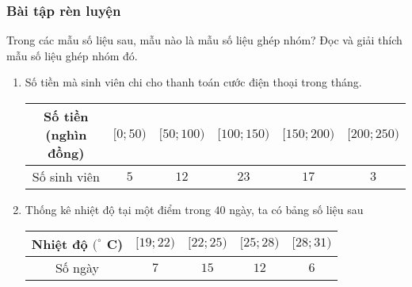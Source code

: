 \subsubsection{Bài tập rèn luyện}
\begin{bt}%
	Trong các mẫu số liệu sau, mẫu nào là mẫu số liệu ghép nhóm? Đọc và giải thích mẫu số liệu ghép nhóm đó.
	\begin{enumerate}
		\item Số tiền mà sinh viên chi cho thanh toán cước điện thoại trong tháng.
		      \begin{center}
			      \begin{tabular}{|c|c|c|c|c|c|}
				      \hline
				      Số tiền (nghìn đồng) & $[0;50)$ & $[50;100)$ & $[100;150)$ & $[150;200)$ & $[200;250)$ \\
				      \hline
				      Số sinh viên         & $5$      & $12$       & $23$        & $17$        & $3$         \\
				      \hline
			      \end{tabular}
		      \end{center}
		\item Thống kê nhiệt độ tại một điểm trong $40$ ngày, ta có bảng số liệu sau
		      \begin{center}
			      \begin{tabular}{|c|c|c|c|c|}
				      \hline
				      Nhiệt độ $(^\circ$ C) & $[19;22)$ & $[22;25)$ & $[25;28)$ & $[28;31)$ \\
				      \hline
				      Số ngày               & $7$       & $15$      & $12$      & $6$       \\
				      \hline
			      \end{tabular}
		      \end{center}
	\end{enumerate}
\end{bt}
